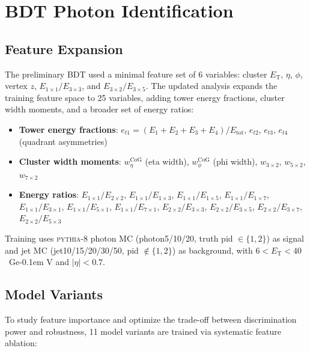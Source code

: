 \documentclass[11pt,a4paper]{article}
\newcommand{\ET}{\ensuremath{E_{\text{T}}}\xspace}
\newcommand{\GeV}{\ifmmode {\mathrm{\ Ge\kern -0.1em V}}\else\textrm{Ge\kern -0.1em V}\fi\xspace}
\begin{document}
\section{BDT Photon Identification}
\label{sec:bdt}

\subsection{Feature Expansion}
\label{subsec:bdt_features}

The preliminary BDT used a minimal feature set of 6 variables: cluster \ET,
$\eta$, $\phi$, vertex $z$, $E_{1\times1}/E_{3\times3}$, and $E_{3\times2}/E_{3\times5}$.
The updated analysis expands the training feature space to 25 variables, adding
tower energy fractions, cluster width moments, and a broader set of energy
ratios:

\begin{itemize}
    \item \textbf{Tower energy fractions}: $e_{t1} = (E_1{+}E_2{+}E_3{+}E_4)/E_{\text{tot}}$,
      $e_{t2}$, $e_{t3}$, $e_{t4}$ (quadrant asymmetries)
    \item \textbf{Cluster width moments}: $w_\eta^{\text{CoG}}$ (eta width),
      $w_\phi^{\text{CoG}}$ (phi width), $w_{3\times2}$, $w_{5\times2}$, $w_{7\times2}$
    \item \textbf{Energy ratios}: $E_{1\times1}/E_{2\times2}$,
      $E_{1\times1}/E_{1\times3}$, $E_{1\times1}/E_{1\times5}$,
      $E_{1\times1}/E_{1\times7}$, $E_{1\times1}/E_{3\times1}$,
      $E_{1\times1}/E_{5\times1}$, $E_{1\times1}/E_{7\times1}$,
      $E_{2\times2}/E_{3\times3}$, $E_{2\times2}/E_{3\times5}$,
      $E_{2\times2}/E_{3\times7}$, $E_{2\times2}/E_{5\times3}$
\end{itemize}

Training uses \textsc{pythia-8} photon MC (photon5/10/20, truth pid $\in \{1,2\}$)
as signal and jet MC (jet10/15/20/30/50, pid $\notin \{1,2\}$) as background,
with $6 < \ET < 40$~\GeV and $|\eta| < 0.7$.

\subsection{Model Variants}
\label{subsec:bdt_variants}

To study feature importance and optimize the trade-off between discrimination
power and robustness, 11 model variants are trained via systematic feature
ablation:
\end{document}
